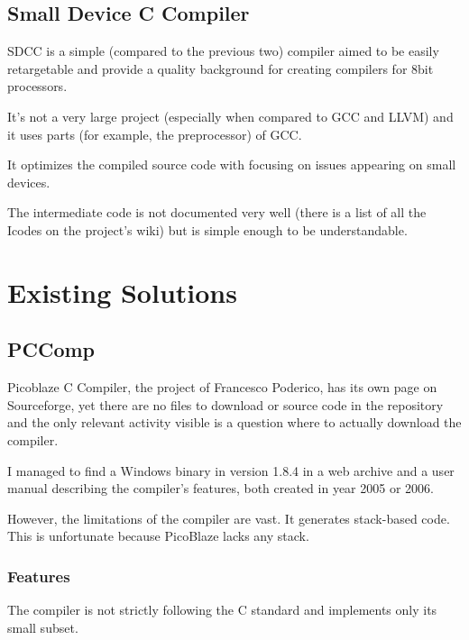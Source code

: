    \section{Small Device C Compiler}

    SDCC is a simple (compared to the previous two) compiler aimed to be easily retargetable and provide a quality background for creating compilers for 8bit processors.

    It's not a very large project (especially when compared to GCC and LLVM) and it uses parts (for example, the preprocessor) of GCC.

    It optimizes the compiled source code with focusing on issues appearing on small devices.

    The intermediate code is not documented very well (there is a list of all the Icodes on the project's wiki) but is simple enough to be understandable.


\chapter{Existing Solutions}\label{existing}

    \section{PCComp}\label{pccomp}

    Picoblaze C Compiler, the project of Francesco Poderico, has its own page on Sourceforge, %
    yet there are no files to download or source code in the repository and the only relevant activity visible is a question where to actually download the compiler.

    I managed to find a Windows binary in version 1.8.4 in a web archive and a user manual describing the compiler's features, both created in year 2005 or 2006.

    However, the limitations of the compiler are vast. It generates stack-based code. This is unfortunate because PicoBlaze lacks any stack. 

        \subsection{Features}

        The compiler is not strictly following the C standard and implements only its small subset.

